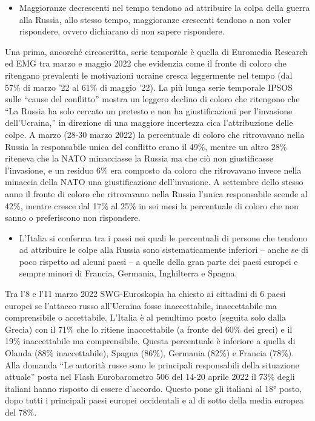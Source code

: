 \documentclass[
  openany]{book}
\providecommand{\tightlist}{%
  \setlength{\itemsep}{0pt}\setlength{\parskip}{0pt}}
\begin{document}
\begin{itemize}
\tightlist
\item
  Maggioranze decrescenti nel tempo tendono ad attribuire la colpa della guerra alla Russia, allo stesso tempo, maggioranze crescenti tendono a non voler rispondere, ovvero dichiarano di non sapere rispondere.
\end{itemize}

Una prima, ancorché circoscritta, serie temporale è quella di Euromedia Research ed EMG tra marzo e maggio 2022 che evidenzia come il fronte di coloro che ritengano prevalenti le motivazioni ucraine cresca leggermente nel tempo (dal 57\% di marzo '22 al 61\% di maggio '22). La più lunga serie temporale IPSOS sulle ``cause del conflitto'' mostra un leggero declino di coloro che ritengono che ``La Russia ha solo cercato un pretesto e non ha giustificazioni per l'invasione dell'Ucraina,'' in direzione di una maggiore incertezza cica l'attribuzione delle colpe. A marzo (28-30 marzo 2022) la percentuale di coloro che ritrovavano nella Russia la responsabile unica del conflitto erano il 49\%, mentre un altro 28\% riteneva che la NATO minacciasse la Russia ma che ciò non giustificasse l'invasione, e un residuo 6\% era composto da coloro che ritrovavano invece nella minaccia della NATO una giustificazione dell'invasione. A settembre dello stesso anno il fronte di coloro che ritrovavano nella Russia l'unica responsabile scende al 42\%, mentre cresce dal 17\% al 25\% in sei mesi la percentuale di coloro che non sanno o preferiscono non rispondere.

\begin{itemize}
\tightlist
\item
  L'Italia si conferma tra i paesi nei quali le percentuali di persone che tendono ad attribuire le colpe alla Russia sono sistematicamente inferiori -- anche se di poco rispetto ad alcuni paesi -- a quelle della gran parte dei paesi europei e sempre minori di Francia, Germania, Inghilterra e Spagna.
\end{itemize}

Tra l'8 e l'11 marzo 2022 SWG-Euroskopia ha chiesto ai cittadini di 6 paesi europei se l'attacco russo all'Ucraina fosse inaccettabile, inaccettabile ma comprensibile o accettabile. L'Italia è al penultimo posto (seguita solo dalla Grecia) con il 71\% che lo ritiene inaccettabile (a fronte del 60\% dei greci) e il 19\% inaccettabile ma comprensibile. Questa percentuale è inferiore a quella di Olanda (88\% inaccettabile), Spagna (86\%), Germania (82\%) e Francia (78\%). Alla domanda ``Le autorità russe sono le principali responsabili della situazione attuale'' posta nel Flash Eurobarometro 506 del 14-20 aprile 2022 il 73\% degli italiani hanno risposto di essere d'accordo. Questo pone gli italiani al 18° posto, dopo tutti i principali paesi europei occidentali e al di sotto della media europea del 78\%.
\end{document}
